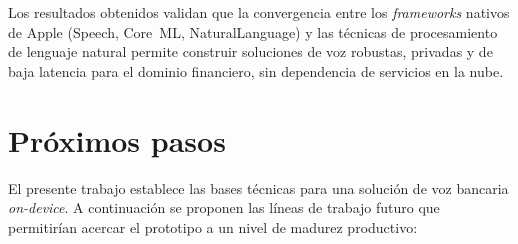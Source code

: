 Los resultados obtenidos validan que la convergencia entre los \textit{frameworks} nativos de Apple (Speech, Core~ML, Natural\-Language) y las técnicas de procesamiento de lenguaje natural permite construir soluciones de voz robustas, privadas y de baja latencia para el dominio financiero, sin dependencia de servicios en la nube.



\section{Próximos pasos}

El presente trabajo establece las bases técnicas para una solución de voz bancaria \textit{on-device}. A continuación se proponen las líneas de trabajo futuro que permitirían acercar el prototipo a un nivel de madurez productivo:

